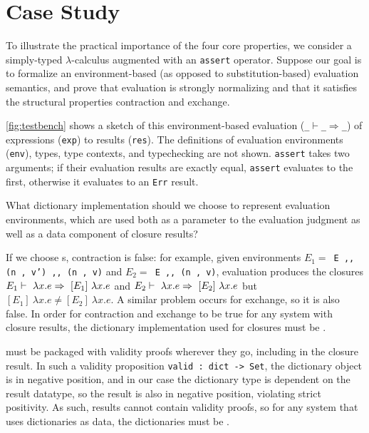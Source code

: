 \section{Case Study}
\label{sec:CaseStudy}



To illustrate the practical importance of the four core properties, we consider a simply-typed $\lambda$-calculus augmented with an \texttt{assert} operator.
%
Suppose our goal is to formalize an environment-based (as opposed to substitution-based) evaluation semantics,
%
and prove that evaluation is strongly normalizing and that it satisfies the structural properties contraction and exchange.

\autoref{fig:testbench} shows a sketch of this environment-based evaluation (\texttt{\_$\vdash$\_$\Rightarrow$\_}) of expressions (\texttt{exp}) to results (\texttt{res}).
%
The definitions of evaluation environments (\texttt{env}), types, type contexts, and typechecking are not shown.
%
%
\texttt{assert} takes two arguments; if their evaluation results are exactly equal, \texttt{assert} evaluates to the first,
otherwise it evaluates to an \texttt{Err} result.

What dictionary implementation should we choose to represent evaluation environments,
which are used both as a parameter to the evaluation judgment as well as a data component of closure results?
%

If we choose \sal{}s, contraction is false:
%
for example, given environments
%
$E_1=$\ \texttt{E ,, (n , v') ,, (n , v)} and
%
$E_2=$\ \texttt{E ,, (n , v)},
%
evaluation produces the closures
%
$E_1 \vdash~\lambda x. e \Rightarrow~[E_1]\ \lambda x. e$
%
and
%
$E_2 \vdash~\lambda x. e \Rightarrow~[E_2]\ \lambda x. e$
%
but
%
$[E_1]\ \lambda x. e \neq [E_2]\ \lambda x. e$.
%
A similar problem occurs for exchange, so it is also false.
%
In order for contraction and exchange to be true for any system with closure results,
the dictionary implementation used for closures must be \extensional.

\Cals{} must be packaged with validity proofs wherever they go, including in the closure result.
In such a validity proposition \texttt{valid : dict -> Set},
%
%
the dictionary object is in negative position,
and in our case the dictionary type is dependent on the result datatype,
so the result is also in negative position, violating strict positivity.
As such, results cannot contain validity proofs, so for any system that uses dictionaries as data,
the dictionaries must be \total.

